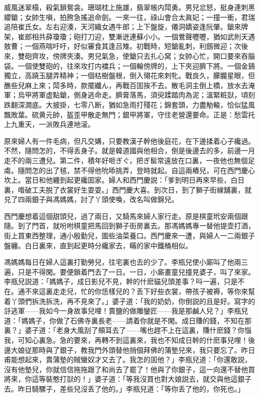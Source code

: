 \begin{myquote}
威風迷翠榻，殺氣鎖鴛衾。珊瑚枕上施雄，翡翠帳内鬦勇。男兒忿怒，挺身連刺黑纓鎗；女帥生嗔，拍胯急搖追命劍。一來一往，祿山會合太眞妃；一撞一衝，君瑞追陪崔氏女。左右迎湊，天河織女遇牛郎；上下盤旋，僊洞嬌姿逢阮肇。鎗來牌架，崔郎相共薛瓊瓊；砲打刀迎，雙漸迸連蘇小小。一個鶯聲嚦嚦，猶如武則天遇敖曹；一個燕喘吁吁，好似審食其逢吕雉。初戰時，短鎗亂刺，利劔微迎；次後來，雙砲齊攻，傍牌夾湊。男兒氣急，使鎗只去扎心窝；女帥心忙，開口要來吞腦袋。一個使雙砲的，往來攻打内襠兵；一個輪傍牌的，上下夾迎臍下將。一個金鷄獨立，高蹺玉腿弄精神；一個枯樹盤根，倒入翎花來刺牝。戰良久，朦朧星眼，但醮些兒麻上來；鬦多時，款擺纖ん，再戰百囬挨不去。散毛洞主倒上橋，放水去淹軍；烏甲將軍虚點鎗，側身逃命走。臍膏落馬，須臾蹂踏肉為泥；溫緊粧獃，頃刻跌翻深澗底。大披掛，七零八断，猶如急雨打殘花；錦套頭，力盡觔輸，恰似猛風飄敗葉。硫黄元帥，盔歪甲散走無門；銀甲將軍，守住老營還要命。正是：愁雲托上九重天，一派敗兵連地滚。
\end{myquote}

原來婦人有一件毛病，但凡交媾，只要教漢子幹他後庭花，在下邊揉着心子纔過。不然，隨問怎的，不得丢身子。就是韓道國與他相合，倒是後邊去的多，前邊一月走不的兩三遭兒。第二件，積年好咂ぎぐ，把ぎ䯲常遠放在口裏，一夜他也無個足䖏。隨問怎的出了毧，禁不得他吮㖭挑弄，登時就起。自這兩樁兒，可在西門慶心坎上。當日和他纏到起更纔囬家。婦人和西門慶説：「爹到明日再來早些，白日裏，喒破工夫脱了衣裳好生耍耍。」西門慶大喜。到次日，到了獅子街線舖裏，就兑了四兩銀子與馮媽媽，討了丫頭使喚，改名叫做錦兒。

西門慶想着這個甜頭兒，過了兩日，又騎馬來婦人家行走。原是棋童玳安兩個跟隨。到了門首，就吩咐棋童把馬回到獅子街房裏去。那馮媽媽專一替他提壶打酒，街上買東西整理，通小殷勤兒，圖些油菜養口。西門慶來一遭，與婦人一二兩銀子盤纏。白日裏來，直到起更時分纔家去，瞞的家中鐵桶相似。

馮媽媽每日在婦人這裏打勤勞兒，往宅裏也去的少了。李瓶兒使小廝叫了他兩三遍，只是不得閑。要便鎖着門去了一日。一日，小廝畫童兒撞見婆子，叫了來家。李瓶兒説道：「媽媽子，成日影兒不見，幹的什麽貓兒頭差事？呌一遍，只是不在。通不來這裏走走兒，忙的你恁樣兒的？丢下好些衣裳，帶孩子被褥，等你來幫着丫頭們拆洗拆洗，再不見來了。」婆子道：「我的奶奶，你倒説的且是好。寫字的㧱逃軍——我如今一身故事兒哩！賣鹽的做雕鑾匠——我是那鹹人兒？」李瓶兒道：「媽媽子，你做了石佛寺裏長老——請着你就是不閑。成日賺的錢，不知在那裏？」婆子道：「老身大風刮了頰耳去了——嘴也趕不上在這裏，賺什麽錢？你惱我，可知心裏急。急的要來，再轉不到這裏來，我也不知成日幹的什麽事兒哩！後邊大娘従那時與了銀子，教我門外頭替他捎個拜佛的蒲墊兒來，我只要忘了。昨日甫能想起來，賣蒲墊的賊蠻奴才又去了。我怎的囬他？」李瓶兒道：「你還敢説，沒有他墊兒，你就信信拖拖跟了和尚去了罷了！他與了你銀子，這一向還不替他買將來，你這等裝憨打獃的！」婆子道：「等我沒買也對大娘説去，就交與他這銀子去。昨日騎騾子，差些兒沒丢了他的。」李瓶兒道：「等你丢了他的，你死也。」

